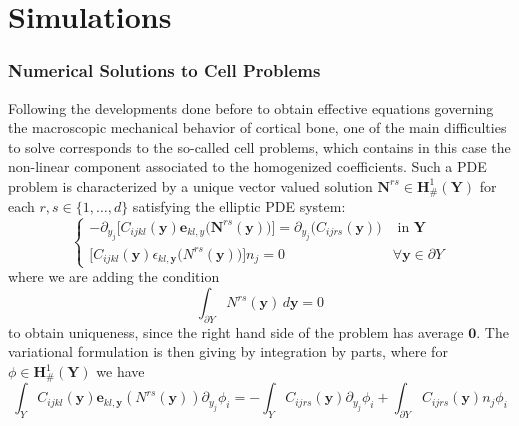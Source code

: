 \chapter{Simulations}

\subsection{Numerical Solutions to Cell Problems}
Following the developments done before to obtain effective equations governing the macroscopic mechanical behavior of cortical bone, one of the main difficulties to solve corresponds to the so-called cell problems, which contains in this case the non-linear component associated to the homogenized coefficients.
Such a PDE problem is characterized by a unique vector valued solution $\mathbf{N}^{rs} \in \mathbf{H}^1_{\#} (\mathbf{Y})$ for each $r,s \in \{1,\dots, d\}$ satisfying the elliptic PDE system:
\begin{equation*}
    \left \{
    \begin{array}{cc}
        - \partial_{y_j} \big[C_{ijkl}(\mathbf{y}) \mathbf{e}_{kl,y} \big( \mathbf{N}^{rs}(\mathbf{y}) \big)  \big] = \partial_{y_j} \big( C_{ijrs} (\mathbf{y}) \big)& \text{ in } \mathbf{Y} \\
        \big[ C_{ijkl}(\mathbf{y}) \epsilon_{kl,\mathbf{y}}\big( N^{rs}(\mathbf{y}) \big) \big]n_j = 0 &  \forall \mathbf{y} \in \partial Y
    \end{array}
    \right.
\end{equation*}
where we are adding the condition 
\begin{equation*}
    \int_{\partial Y} N^{rs}(\mathbf{y}) \, d\mathbf{y} = 0
\end{equation*}
to obtain uniqueness, since the right hand side of the problem has average $\mathbf{0}$.
The variational formulation is then giving by integration by parts, where for $\phi \in \mathbf{H}^1_{\#}(\mathbf{Y})$ we have
\begin{equation*}
    \int_{Y} C_{ijkl}(\mathbf{y}) \mathbf{e}_{kl,\mathbf{y}}(N^{rs}(\mathbf{y})) \partial_{y_j}\phi_i = - \int_{Y}C_{ijrs}(\mathbf{y}) \partial_{y_j} \phi_i + \int_{\partial Y}C_{ijrs}(\mathbf{y}) n_j \phi_i
\end{equation*}

